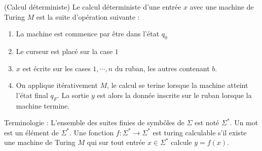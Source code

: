                 \begin{defi} (Calcul déterministe)
                    Le calcul déterministe d'une entrée $x$ avec une machine de Turing $M$ est la suite d'opération suivante :
                    \begin{enumerate}
                        \item La machine est commence par être dans l'état $q_0$
                        \item Le curseur est placé sur la case $1$
                        \item $x$ est écrite sur les cases $1, \cdots, n$ du ruban, les autres contenant $b$.
                        \item On applique itérativement $M$, le calcul se terine lorsque la machine atteint l'état final $q_F$. La sortie $y$ est alors la donnée inscrite sur le ruban lorsque la machine termine.
                    \end{enumerate}
                \end{defi}
                Terminologie : L'ensemble des suites finies de symbôles de $\Sigma$ est noté $\Sigma^*$. Un mot est un élément de $\Sigma^*$. Une fonction $f : \Sigma^* \to \Sigma^*$ est turing calculable s'il existe une machine de Turing $M$ qui sur tout entrée $x \in \Sigma^*$ calcule $y = f(x)$.

